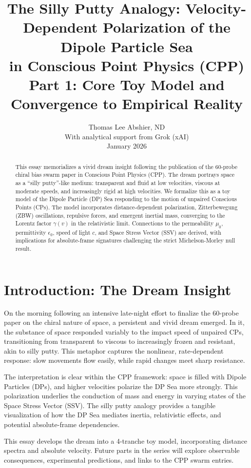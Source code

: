 \documentclass[11pt]{article}
\title{The Silly Putty Analogy: Velocity-Dependent Polarization of the Dipole Particle Sea \\
in Conscious Point Physics (CPP) \\
\small{Part 1: Core Toy Model and Convergence to Empirical Reality}}
\author{Thomas Lee Abshier, ND \\
\small{With analytical support from Grok (xAI)} \\
\small{January 2026}}
\date{}
\begin{document}
\maketitle

\begin{abstract}
This essay memorializes a vivid dream insight following the publication of the 60-probe chiral bias swarm paper in Conscious Point Physics (CPP). The dream portrays space as a ``silly putty''-like medium: transparent and fluid at low velocities, viscous at moderate speeds, and increasingly rigid at high velocities. We formalize this as a toy model of the Dipole Particle (DP) Sea responding to the motion of unpaired Conscious Points (CPs). The model incorporates distance-dependent polarization, Zitterbewegung (ZBW) oscillations, repulsive forces, and emergent inertial mass, converging to the Lorentz factor $\gamma(v)$ in the relativistic limit. Connections to the permeability $\mu_0$, permittivity $\epsilon_0$, speed of light $c$, and Space Stress Vector (SSV) are derived, with implications for absolute-frame signatures challenging the strict Michelson-Morley null result.
\end{abstract}

\section{Introduction: The Dream Insight}

On the morning following an intensive late-night effort to finalize the 60-probe paper on the chiral nature of space, a persistent and vivid dream emerged. In it, the substance of space responded variably to the impact speed of unpaired CPs, transitioning from transparent to viscous to increasingly frozen and resistant, akin to silly putty. This metaphor captures the nonlinear, rate-dependent response: slow movements flow easily, while rapid changes meet sharp resistance.

The interpretation is clear within the CPP framework: space is filled with Dipole Particles (DPs), and higher velocities polarize the DP Sea more strongly. This polarization underlies the conduction of mass and energy in varying states of the Space Stress Vector (SSV). The silly putty analogy provides a tangible visualization of how the DP Sea mediates inertia, relativistic effects, and potential absolute-frame dependencies.

This essay develops the dream into a 4-tranche toy model, incorporating distance spectra and absolute velocity. Future parts in the series will explore observable consequences, experimental predictions, and links to the CPP swarm entries.
\end{document}
